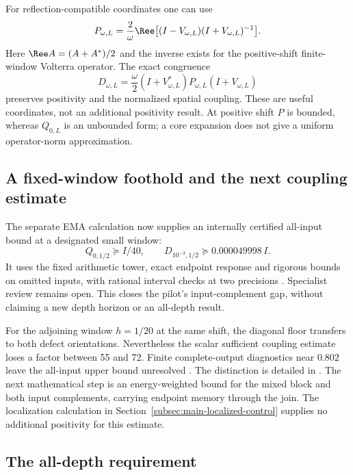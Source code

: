 For reflection-compatible coordinates one can use
\[
 P_{\omega,L}=\frac2\omega\Ree\bigl[(I-V_{\omega,L})
                                    (I+V_{\omega,L})^{-1}\bigr].
\]
Here $\Ree A=(A+A^*)/2$ and the inverse exists for the
positive-shift finite-window Volterra operator.
The exact congruence
\begin{equation}
 D_{\omega,L}=\frac\omega2(I+V_{\omega,L}^*)P_{\omega,L}
                                      (I+V_{\omega,L})
\end{equation}
preserves positivity and the normalized spatial coupling.
These are useful coordinates, not an additional positivity result.
At positive shift $P$ is bounded, whereas $Q_{0,L}$ is an unbounded
form; a core expansion does not give a uniform operator-norm
approximation.

\subsection{A fixed-window foothold and the next coupling estimate}

The separate EMA calculation now supplies an internally certified
all-input bound at a designated small window:
\begin{equation}\label{eq:main-ema-anchor}
 Q_{0,1/2}\succeq I/40,\qquad
 D_{10^{-3},1/2}\succeq0.000049998\,I.
\end{equation}
It uses the fixed arithmetic tower, exact endpoint response and
rigorous bounds on omitted inputs, with rational interval checks
at two precisions \cite{EMAAnchor}. Specialist review remains open.
This closes the pilot's input-complement gap, without claiming a
new depth horizon or an all-depth result.

For the adjoining window $h=1/20$ at the same shift, the diagonal
floor transfers to both defect orientations. Nevertheless the
scalar sufficient coupling estimate loses a factor between 55 and
72. Finite complete-output diagnostics near $0.802$ leave the
all-input upper bound unresolved \cite{CumulativeAppend}.
The distinction is detailed in \cite[Section~S9.5]{Supplement}.
The next mathematical step is an energy-weighted bound for the
mixed block and both input complements, carrying endpoint memory
through the join. The localization calculation in
Section~\ref{subsec:main-localized-control} supplies no additional
positivity for this estimate.

\subsection{The all-depth requirement}

